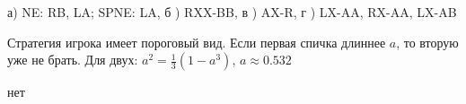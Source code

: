 \begin{solution}{6.29}

\end{solution}
\begin{solution}{6.30}

\end{solution}
\begin{solution}{6.31}
\end{solution}
\begin{solution}{6.32}

\end{solution}
\begin{solution}{6.33}

\end{solution}
\begin{solution}{6.34}

\end{solution}
\begin{solution}{6.35}

\end{solution}
\begin{solution}{6.36}

\end{solution}
\begin{solution}{6.37}

\end{solution}
\begin{solution}{6.38}

\end{solution}
\begin{solution}{6.39}

\end{solution}
\begin{solution}{6.40}
 а)  NE: RB, LA; SPNE: LA, б ) RXX-BB, в ) AX-R, г ) LX-AA, RX-AA, LX-AB
\end{solution}
\begin{solution}{6.41}
\end{solution}
\begin{solution}{6.42}
Стратегия игрока имеет пороговый вид. Если первая спичка длиннее $a$, то вторую уже не брать. Для двух: $a^{2}=\frac{1}{3}(1-a^{3})$, $a\approx 0.532$
\end{solution}
\begin{solution}{6.43}
нет
\end{solution}
\begin{solution}{6.44}

\end{solution}
\begin{solution}{6.45}

\end{solution}
